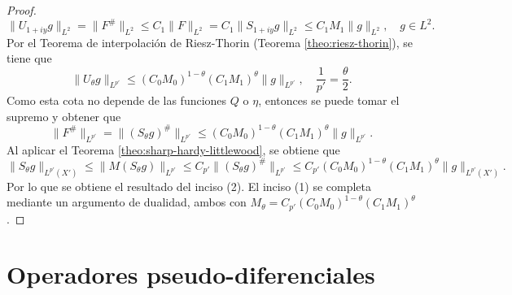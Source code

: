 \begin{proof}
	\begin{equation*}
		\|U_{1+iy} g\|_{L^2} = \|F^\#\|_{L^2} \leq C_1\|F\|_{L^2}= C_1\|S_{1+iy}g\|_{L^2} \leq C_1M_1 \|g\|_{L^2}, \quad g\in L^2.
	\end{equation*}
	Por el Teorema de interpolación de Riesz-Thorin (Teorema \ref{theo:riesz-thorin}), se tiene que 
	\begin{equation*}
		\|U_\theta g\|_{L^{p'}} \leq (C_0M_0)^{1-\theta}(C_1M_1)^\theta \|g\|_{L^{p'}}, \quad \frac{1}{p'} = \frac{\theta}{2}.
	\end{equation*}
	Como esta cota no depende de las funciones $Q$ o $\eta$, entonces se puede tomar el supremo y obtener que 
	\begin{equation*}
		\|F^\#\|_{L^{p'}} =\| (S_\theta g)^\#\|_{L^{p'}} \leq (C_0M_0)^{1-\theta}(C_1M_1)^\theta \|g\|_{L^{p'}}.
	\end{equation*}
	Al aplicar el Teorema \ref{theo:sharp-hardy-littlewood}, se obtiene que 
	\begin{equation*}
		\|S_\theta g\|_{L^{p'}(X')} \leq \|M(S_\theta g)\|_{L^{p'}} \leq C_{p'} \|(S_\theta g)^\#\|_{L^{p'}} \leq C_{p'} (C_0M_0)^{1-\theta}(C_1M_1)^\theta \|g\|_{L^{p'}(X')}.
	\end{equation*}
	Por lo que se obtiene el resultado del inciso (2). El inciso (1) se completa mediante un argumento de dualidad, ambos con $M_\theta = C_{p'} (C_0M_0)^{1-\theta}(C_1M_1)^\theta$.
\end{proof}
\chapter{Operadores pseudo-diferenciales}
